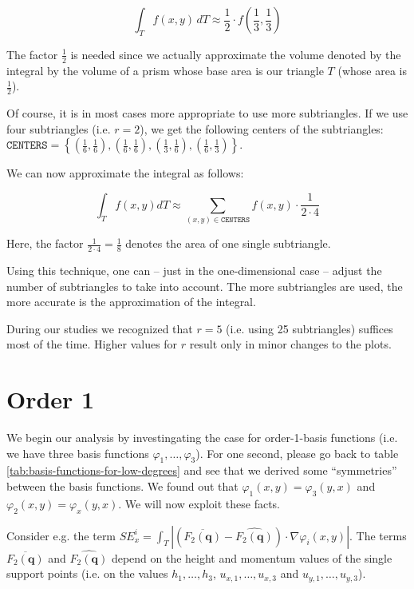 \documentclass{article}
\renewcommand{\phi}{\varphi}
\begin{document}
\begin{equation*}
  \int_T f(x,y)\, dT \approx \frac{1}{2} \cdot f(\frac{1}{3},\frac{1}{3})
\end{equation*}

The factor $\frac{1}{2}$ is needed since we actually approximate the volume denoted by the integral by the volume of a prism whose base area is our triangle $T$ (whose area is $\frac{1}{2}$).

Of course, it is in most cases more appropriate to use more subtriangles. If we use four subtriangles (i.e. $r=2$), we get the following centers of the subtriangles: $\mathtt{CENTERS} = \left\{ (\frac{1}{6}, \frac{1}{6}), (\frac{1}{6}, \frac{1}{6}), (\frac{1}{3}, \frac{1}{6}), (\frac{1}{6},\frac{1}{3}) \right\}$.

We can now approximate the integral as follows:

\begin{equation*}
  \int_T f(x,y) dT \approx \sum_{(x,y)\in\mathtt{CENTERS}} f(x,y)\cdot \frac{1}{2\cdot 4}
\end{equation*}

Here, the factor $\frac{1}{2\cdot 4}= \frac{1}{8}$ denotes the area of one single subtriangle.

Using this technique, one can -- just in the one-dimensional case -- adjust the number of subtriangles to take into account. The more subtriangles are used, the more accurate is the approximation of the integral.

During our studies we recognized that $r=5$ (i.e. using 25 subtriangles) suffices most of the time. Higher values for $r$ result only in minor changes to the plots.

\section{Order 1}
\label{sec:stiffness-analysis-first-touch}

We begin our analysis by investingating the case for order-1-basis functions (i.e. we have three basis functions $\phi_1,\dots,\phi_3$). For one second, please go back to table \ref{tab:basis-functions-for-low-degrees} and see that we derived some ``symmetries'' between the basis functions. We found out that $\phi_1(x,y)=\phi_3(y,x)$ and $\phi_2(x,y)=\phi_x(y,x)$. We will now exploit these facts.

Consider e.g. the term $SE_x^i = \int_T \left| \left(\overline{F_2(\mathbf{q})}-\widehat{F_2(\mathbf{q})}\right) \cdot \nabla\phi_i(x,y) \right|$. The terms $\overline{F_2(\mathbf{q})}$ and $\widehat{F_2(\mathbf{q})}$ depend on the height and momentum values of the single support points (i.e. on the values $h_1,\dots,h_3$, $u_{x,1},\dots,u_{x,3}$ and $u_{y,1},\dots,u_{y,3}$).
\end{document}
